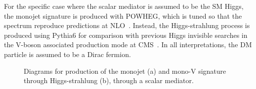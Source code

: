 For the specific case where the scalar mediator is assumed to be the SM Higgs, the monojet signature is produced with POWHEG, which is tuned so that the \pt spectrum reproduce predictions at 
NLO~\cite{Heinemeyer:2013tqa}. Instead, the Higgs-strahlung process is produced using Pythia6 for comparison with previous Higgs invisible searches in the V-boson associated production mode at CMS~\cite{zllhinv,monoZHbb}. 
In all interpretations, the DM particle is assumed to be a Dirac fermion. 


\begin{figure}[htbp]
  \centering
  \caption{Diagrams for production of the monojet (a) and mono-V signature through Higgs-strahlung (b), through a scalar mediator.\label{fig:monoXfeyn}}
\end{figure}

%

